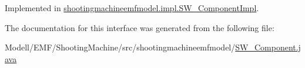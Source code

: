 Implemented in \hyperlink{classshootingmachineemfmodel_1_1impl_1_1_s_w___component_impl_a506d6529374f47b28cb78ec920852c3b}{shootingmachineemfmodel.\-impl.\-S\-W\-\_\-\-Component\-Impl}.



The documentation for this interface was generated from the following file\-:\begin{DoxyCompactItemize}
\item 
Modell/\-E\-M\-F/\-Shooting\-Machine/src/shootingmachineemfmodel/\hyperlink{_s_w___component_8java}{S\-W\-\_\-\-Component.\-java}\end{DoxyCompactItemize}
